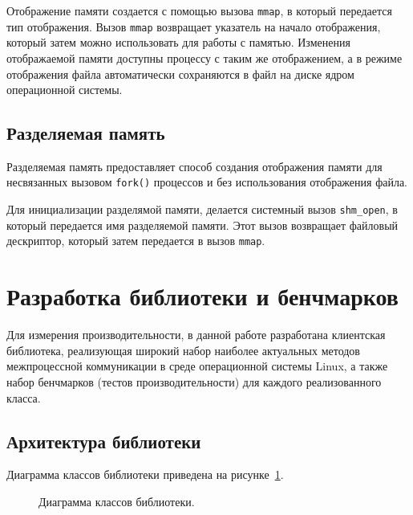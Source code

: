 \documentclass[14pt, russian]{scrartcl}
\begin{document}
Отображение памяти создается с помощью вызова \verb|mmap|, в который передается
тип отображения. Вызов \verb|mmap| возвращает указатель на начало отображения,
который затем можно использовать для работы с памятью. Изменения отображаемой
памяти доступны процессу с таким же отображением, а в режиме отображения файла
автоматически сохраняются в файл на диске ядром операционной системы.

\subsection{Разделяемая память}

Разделяемая память предоставляет способ создания отображения памяти для
несвязанных вызовом \verb|fork()| процессов и без использования отображения
файла.

Для инициализации разделямой памяти, делается системный вызов \verb|shm_open|, в
который передается имя разделяемой памяти. Этот вызов возвращает файловый
дескриптор, который затем передается в вызов \verb|mmap|.

\section{Разработка библиотеки и бенчмарков}

Для измерения производительности, в данной работе разработана клиентская
библиотека, реализующая широкий набор наиболее актуальных методов межпроцессной
коммуникации в среде операционной системы Linux, а также набор бенчмарков
(тестов производительности) для каждого реализованного класса.

\subsection{Архитектура библиотеки}

Диаграмма классов библиотеки приведена на рисунке~\ref{fig:classes}.

\begin{figure}[H]
  \centering
  \begin{minipage}[t]{\textwidth}
    \centering
    \resizebox{\textwidth}{9cm}{%
    
    }
  \end{minipage}
  \caption{Диаграмма классов библиотеки.}
  \label{fig:classes}
\end{figure}
\end{document}
